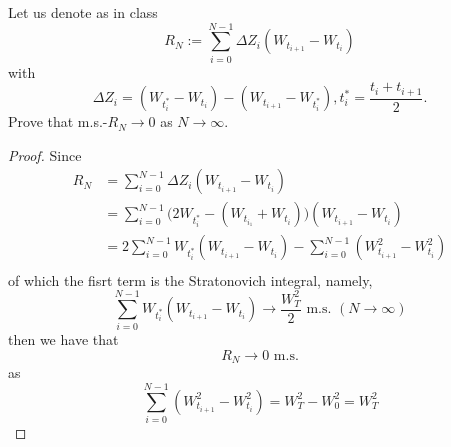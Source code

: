     \problem
    \begin{question}
    Let us denote as in class 
    \[R_N:=\sum^{N-1}_{i=0}\Delta Z_i(W_{t_{i+1}}-W_{t_{i}})\]
    with 
    \[\Delta Z_i=(W_{t^*_{i}}-W_{t_{i}})-(W_{t_{i+1}}-W_{t^*_{i}}), t^*_i=\frac{t_i+t_{i+1}}{2}.\]
    Prove that m.s.-$R_N\rightarrow 0$ as $N\rightarrow \infty$.
    \end{question}
    \begin{proof}
        Since
        \[\begin{aligned}
            R_N&=\sum_{i=0}^{N-1}\Delta Z_i(W_{t_{i+1}}-W_{t_i})\\
            &=\sum_{i=0}^{N-1}\big(2W_{t_i^*}-(W_{t_{i_1}}+W_{t_i})
              \big)(W_{t_{i+1}}-W_{t_i})\\ 
            &=2\sum_{i=0}^{N-1}W_{t^*_i}(W_{t_{i+1}}-W_{t_i})
              -\sum_{i=0}^{N-1}(W_{t_{i+1}}^2-W_{t_i}^2)\\
        \end{aligned}\]
        of which the fisrt term is the Stratonovich integral, namely,
        \[\sum_{i=0}^{N-1}W_{t_i^*}(W_{t_{i+1}}-W_{t_i})\to\frac{W_T^2}{2}
        \text{ m.s. }(N\to\infty)\]
        then we have that
        \[R_N\to 0\text{ m.s.}\]
        as
        \[\sum_{i=0}^{N-1}(W_{t_{i+1}}^2-W_{t_i}^2)=W_T^2-W_0^2=W_T^2\]
    \end{proof}

